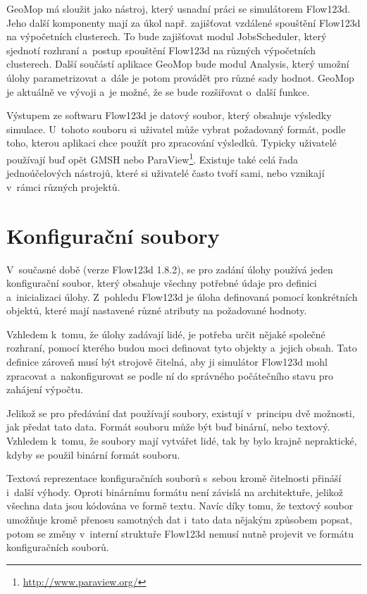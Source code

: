 \documentclass[FM,bw,DP]{tulthesis}
\begin{document}
GeoMop má sloužit jako nástroj, který usnadní práci se simulátorem Flow123d. Jeho další komponenty mají za úkol např. zajišťovat vzdálené spouštění Flow123d na výpočetních clusterech. To bude zajišťovat modul JobsScheduler, který sjednotí rozhraní a~postup spouštění Flow123d na různých výpočetních clusterech. Další součástí aplikace GeoMop bude modul Analysis, který umožní úlohy parametrizovat a~dále je potom provádět pro různé sady hodnot. GeoMop je aktuálně ve vývoji a~je možné, že se bude rozšiřovat o~další funkce. 

Výstupem ze softwaru Flow123d je datový soubor, který obsahuje výsledky simulace. U~tohoto souboru si uživatel může vybrat požadovaný formát, podle toho, kterou aplikaci chce použít pro zpracování výsledků. Typicky uživatelé používají buď opět GMSH nebo ParaView\footnote{\url{http://www.paraview.org/}}. Existuje také celá řada jednoúčelových nástrojů, které si uživatelé často tvoří sami, nebo vznikají v~rámci různých projektů.

\section{Konfigurační soubory}

V~současné době (verze Flow123d 1.8.2), se pro zadání úlohy používá jeden konfigurační soubor, který obsahuje všechny potřebné údaje pro definici a~inicializaci úlohy. Z~pohledu Flow123d je úloha definovaná pomocí konkrétních objektů, které mají nastavené různé atributy na požadované hodnoty. 

Vzhledem k~tomu, že úlohy zadávají lidé, je potřeba určit nějaké společné rozhraní, pomocí kterého budou moci definovat tyto objekty a~jejich obsah. Tato definice zároveň musí být strojově čitelná, aby ji simulátor Flow123d mohl zpracovat a~nakonfigurovat se podle ní do správného počátečního stavu pro zahájení výpočtu.

Jelikož se pro předávání dat používají soubory, existují v~principu dvě možnosti, jak předat tato data. Formát souboru může být buď binární, nebo textový. Vzhledem k~tomu, že soubory mají vytvářet lidé, tak by bylo krajně nepraktické, kdyby se použil binární formát souboru.

Textová reprezentace konfiguračních souborů s~sebou kromě čitelnosti přináší i~další výhody. Oproti binárnímu formátu není závislá na architektuře, jelikož všechna data jsou kódována ve formě textu. Navíc díky tomu, že textový soubor umožňuje kromě přenosu samotných dat i~tato data nějakým způsobem popsat, potom se změny v~interní struktuře Flow123d nemusí nutně projevit ve formátu konfiguračních souborů.
\end{document}
